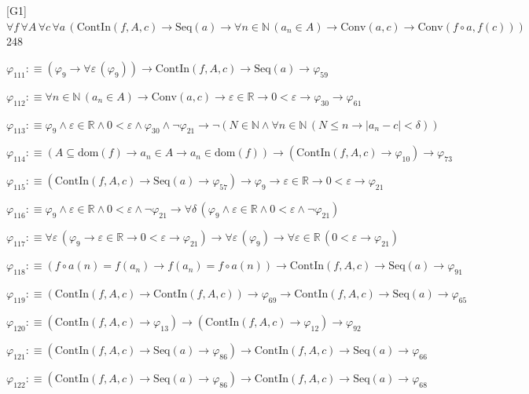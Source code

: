 \begin{fullproof}{[G1]}{$\forall f\,\forall A\,\forall c\,\forall a\,(\mathrm{ContIn}(f,A,c) \to \mathrm{Seq}(a) \to \forall n \in \mathbb{N}\,(a_{n} \in A) \to \mathrm{Conv}(a,c) \to \mathrm{Conv}(f \circ a,f(c)))$}{248}
\begin{abbrevlist}
\item $\varphi_{111} :\equiv (\varphi_{9} \to \forall \varepsilon\,(\varphi_{9})) \to \mathrm{ContIn}(f,A,c) \to \mathrm{Seq}(a) \to \varphi_{59}$
\item $\varphi_{112} :\equiv \forall n \in \mathbb{N}\,(a_{n} \in A) \to \mathrm{Conv}(a,c) \to \varepsilon \in \mathbb{R} \to 0 < \varepsilon \to \varphi_{30} \to \varphi_{61}$
\item $\varphi_{113} :\equiv \varphi_{9} \land \varepsilon \in \mathbb{R} \land 0 < \varepsilon \land \varphi_{30} \land \neg \varphi_{21} \to \neg (N \in \mathbb{N} \land \forall n \in \mathbb{N}\,(N \leq n \to \lvert a_{n} - c \rvert < \delta))$
\item $\varphi_{114} :\equiv (A \subseteq \mathrm{dom}(f) \to a_{n} \in A \to a_{n} \in \mathrm{dom}(f)) \to (\mathrm{ContIn}(f,A,c) \to \varphi_{10}) \to \varphi_{73}$
\item $\varphi_{115} :\equiv (\mathrm{ContIn}(f,A,c) \to \mathrm{Seq}(a) \to \varphi_{57}) \to \varphi_{9} \to \varepsilon \in \mathbb{R} \to 0 < \varepsilon \to \varphi_{21}$
\item $\varphi_{116} :\equiv \varphi_{9} \land \varepsilon \in \mathbb{R} \land 0 < \varepsilon \land \neg \varphi_{21} \to \forall \delta\,(\varphi_{9} \land \varepsilon \in \mathbb{R} \land 0 < \varepsilon \land \neg \varphi_{21})$
\item $\varphi_{117} :\equiv \forall \varepsilon\,(\varphi_{9} \to \varepsilon \in \mathbb{R} \to 0 < \varepsilon \to \varphi_{21}) \to \forall \varepsilon\,(\varphi_{9}) \to \forall \varepsilon \in \mathbb{R}\,(0 < \varepsilon \to \varphi_{21})$
\item $\varphi_{118} :\equiv (f \circ a(n) = f(a_{n}) \to f(a_{n}) = f \circ a(n)) \to \mathrm{ContIn}(f,A,c) \to \mathrm{Seq}(a) \to \varphi_{91}$
\item $\varphi_{119} :\equiv (\mathrm{ContIn}(f,A,c) \to \mathrm{ContIn}(f,A,c)) \to \varphi_{69} \to \mathrm{ContIn}(f,A,c) \to \mathrm{Seq}(a) \to \varphi_{65}$
\item $\varphi_{120} :\equiv (\mathrm{ContIn}(f,A,c) \to \varphi_{13}) \to (\mathrm{ContIn}(f,A,c) \to \varphi_{12}) \to \varphi_{92}$
\item $\varphi_{121} :\equiv (\mathrm{ContIn}(f,A,c) \to \mathrm{Seq}(a) \to \varphi_{86}) \to \mathrm{ContIn}(f,A,c) \to \mathrm{Seq}(a) \to \varphi_{66}$
\item $\varphi_{122} :\equiv (\mathrm{ContIn}(f,A,c) \to \mathrm{Seq}(a) \to \varphi_{86}) \to \mathrm{ContIn}(f,A,c) \to \mathrm{Seq}(a) \to \varphi_{68}$

\end{abbrevlist}
\end{fullproof}
